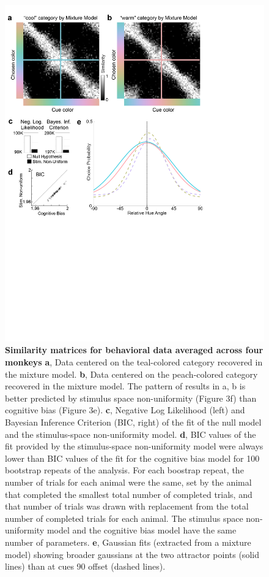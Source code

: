 \documentclass[9pt,biorxiv,lineno,onehalfspacing]{lapreprint}
\begin{document}
\begin{refsection}
\begin{figure}
    \begin{fullwidth}
    \centering
    \includegraphics[width=\textwidth,trim={0 10cm 4cm 0},clip]{Outputs/Paper/Figures/flat/F4_TCCResults_4.png}
    \caption{\textbf{Similarity matrices for behavioral data averaged across four monkeys}
    \textbf{a}, Data centered on the teal-colored category recovered in the mixture model.  
	\textbf{b}, Data centered on the peach-colored category recovered in the mixture model. The pattern of results in a, b is better predicted by stimulus space non-uniformity (Figure 3f) than cognitive bias (Figure 3e). 
	\textbf{c}, Negative Log Likelihood (left) and Bayesian Inference Criterion (BIC, right) of the fit of the null model and the stimulus-space non-uniformity model. 
	\textbf{d}, BIC values of the fit provided by the stimulus-space non-uniformity model were always lower than BIC values of the fit for the cognitive bias model for 100 bootstrap repeats of the analysis. 
    For each boostrap repeat, the number of trials for each animal were the same, set by the animal that completed the smallest total number of completed trials, and that number of trials was drawn with replacement from the total number of completed trials for each animal. 
    The stimulus space non-uniformity model and the cognitive bias model have the same number of parameters. 
    \textbf{e}, Gaussian fits (extracted from a mixture model) showing broader gaussians at the two attractor points (solid lines) than at cues 90\degree{} offset (dashed lines).
    } 
    \label{fig:TCCOutput}
    \end{fullwidth}
\end{figure}


\end{refsection}
\end{document}
